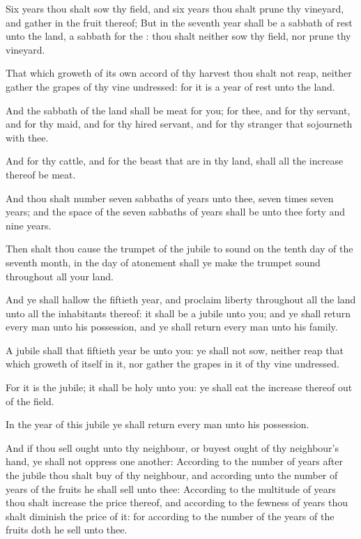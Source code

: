 \verse Six years thou shalt sow thy field, and six years thou shalt prune thy vineyard, and gather in the fruit thereof; \verse But in the seventh year shall be a sabbath of rest unto the land, a sabbath for the \LORD: thou shalt neither sow thy field, nor prune thy vineyard.

\verse That which groweth of its own accord of thy harvest thou shalt not reap, neither gather the grapes of thy vine undressed: for it is a year of rest unto the land.

\verse And the sabbath of the land shall be meat for you; for thee, and for thy servant, and for thy maid, and for thy hired servant, and for thy stranger that sojourneth with thee.

\verse And for thy cattle, and for the beast that are in thy land, shall all the increase thereof be meat.

\verse And thou shalt number seven sabbaths of years unto thee, seven times seven years; and the space of the seven sabbaths of years shall be unto thee forty and nine years.

\verse Then shalt thou cause the trumpet of the jubile to sound on the tenth day of the seventh month, in the day of atonement shall ye make the trumpet sound throughout all your land.

\verse And ye shall hallow the fiftieth year, and proclaim liberty throughout all the land unto all the inhabitants thereof: it shall be a jubile unto you; and ye shall return every man unto his possession, and ye shall return every man unto his family.

\verse A jubile shall that fiftieth year be unto you: ye shall not sow, neither reap that which groweth of itself in it, nor gather the grapes in it of thy vine undressed.

\verse For it is the jubile; it shall be holy unto you: ye shall eat the increase thereof out of the field.

\verse In the year of this jubile ye shall return every man unto his possession.

\verse And if thou sell ought unto thy neighbour, or buyest ought of thy neighbour's hand, ye shall not oppress one another: \verse According to the number of years after the jubile thou shalt buy of thy neighbour, and according unto the number of years of the fruits he shall sell unto thee: \verse According to the multitude of years thou shalt increase the price thereof, and according to the fewness of years thou shalt diminish the price of it: for according to the number of the years of the fruits doth he sell unto thee.

